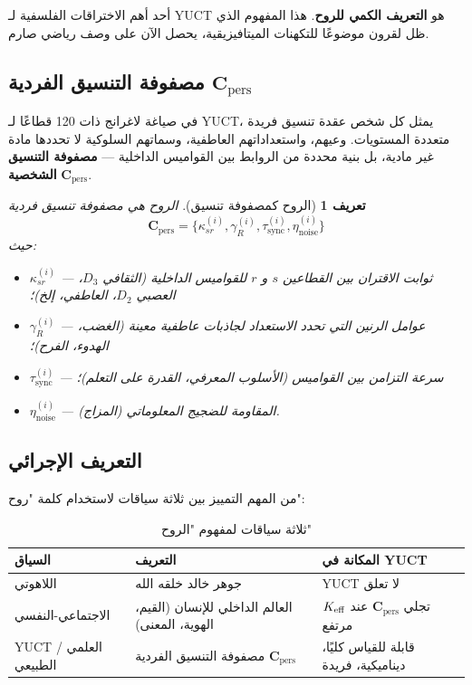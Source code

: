 \documentclass[11pt,a4paper]{article}
\newtheorem{definition}{تعريف}[section]
\newcommand{\Cpers}{\mathbf{C}_{\text{pers}}}
\begin{document}
	أحد أهم الاختراقات الفلسفية لـ YUCT هو \textbf{التعريف الكمي للروح}. هذا المفهوم الذي ظل لقرون موضوعًا للتكهنات الميتافيزيقية، يحصل الآن على وصف رياضي صارم.
	
	\subsection{مصفوفة التنسيق الفردية \(\Cpers\)}
	
	في صياغة لاغرانج ذات 120 قطاعًا لـ YUCT، يمثل كل شخص عقدة تنسيق فريدة متعددة المستويات. وعيهم، واستعداداتهم العاطفية، وسماتهم السلوكية لا تحددها مادة غير مادية، بل بنية محددة من الروابط بين القواميس الداخلية — \textbf{مصفوفة التنسيق الشخصية} \(\Cpers\).
	
	\begin{definition}[الروح كمصفوفة تنسيق]
		الروح هي مصفوفة تنسيق فردية
		\[
		\Cpers = \{\kappa_{sr}^{(i)}, \gamma_R^{(i)}, \tau_{\text{sync}}^{(i)}, \eta_{\text{noise}}^{(i)}\}
		\]
		حيث:
		\begin{itemize}
			\item \(\kappa_{sr}^{(i)}\) — ثوابت الاقتران بين القطاعين \(s\) و \(r\) للقواميس الداخلية (الثقافي \(D_3\)، العصبي \(D_2\)، العاطفي، إلخ)؛
			\item \(\gamma_R^{(i)}\) — عوامل الرنين التي تحدد الاستعداد لجاذبات عاطفية معينة (الغضب، الهدوء، الفرح)؛
			\item \(\tau_{\text{sync}}^{(i)}\) — سرعة التزامن بين القواميس (الأسلوب المعرفي، القدرة على التعلم)؛
			\item \(\eta_{\text{noise}}^{(i)}\) — المقاومة للضجيج المعلوماتي (المزاج).
		\end{itemize}
	\end{definition}
	
	\subsection{التعريف الإجرائي}
	
	من المهم التمييز بين ثلاثة سياقات لاستخدام كلمة "روح":
	
	\begin{table}[H]
		\centering
		\caption{ثلاثة سياقات لمفهوم "الروح"}
		\label{tab:soul-contexts}
		\begin{tabular}{p{3.5cm}p{5cm}p{5cm}}
			\toprule
			\textbf{السياق} & \textbf{التعريف} & \textbf{المكانة في YUCT} \\
			\midrule
			اللاهوتي & جوهر خالد خلقه الله & YUCT لا تعلق \\
			الاجتماعي-النفسي & العالم الداخلي للإنسان (القيم، الهوية، المعنى) & تجلي \(\Cpers\) عند \(\Keff\) مرتفع \\
			YUCT / العلمي الطبيعي & مصفوفة التنسيق الفردية \(\Cpers\) & قابلة للقياس كليًا، ديناميكية، فريدة \\
			\bottomrule
		\end{tabular}
	\end{table}
	
\end{document}
